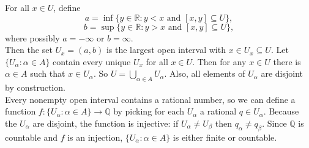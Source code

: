 \documentclass{article}
\newcommand{\R}{\mathbb{R}}
\newcommand{\Q}{\mathbb{Q}}
\begin{document}
For all $x \in U$, define
$$a = \inf\{y \in \R : y < x \text{ and } [x, y] \subseteq U\},$$
$$b = \sup\{y \in \R : y > x \text{ and } [x, y] \subseteq U\},$$
where possibly $a = -\infty$ or $b = \infty$. \\

Then the set $U_x = (a, b)$ is the largest open interval with $x \in U_x \subseteq U$. Let $\{U_\alpha : \alpha \in A\}$ contain every unique $U_x$ for all $x \in U$. Then for any $x \in U$ there is $\alpha \in A$ such that $x \in U_\alpha$. So $U = \bigcup_{\alpha \in A} U_\alpha$. Also, all elements of $U_\alpha$ are disjoint by construction. \\

Every nonempty open interval contains a rational number, so we can define a function $f : \{U_\alpha : \alpha \in A\} \to \Q$ by picking for each $U_\alpha$ a rational $q \in U_\alpha$. Because the $U_\alpha$ are disjoint, the function is injective: if $U_\alpha \neq U_\beta$ then $q_\alpha \neq q_\beta$. Since $\Q$ is countable and $f$ is an injection, $\{U_\alpha : \alpha \in A\}$ is either finite or countable.
\end{document}
